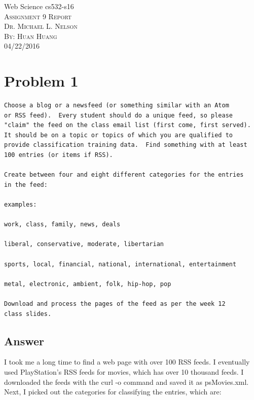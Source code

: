 \documentclass[12pt]{article}
\begin{document}
\begin{titlepage}
	\begin{center}
	\Huge{Web Science cs532-s16}\\
	[0.25in]
	\textsc{\Large Assignment 9 Report}\\
	\textsc{\normalsize Dr. Michael L. Nelson}\\
	[4.25in]
	\textsc{\normalsize By: Huan Huang}\\
	\large 04/22/2016\\
	
	
	\end{center}
\end{titlepage}
\newpage



\section*{Problem 1}


\begin{verbatim}
Choose a blog or a newsfeed (or something similar with an Atom
or RSS feed).  Every student should do a unique feed, so please
"claim" the feed on the class email list (first come, first served).
It should be on a topic or topics of which you are qualified to
provide classification training data.  Find something with at least
100 entries (or items if RSS).

Create between four and eight different categories for the entries
in the feed:

examples: 

work, class, family, news, deals

liberal, conservative, moderate, libertarian

sports, local, financial, national, international, entertainment

metal, electronic, ambient, folk, hip-hop, pop

Download and process the pages of the feed as per the week 12 
class slides.
\end{verbatim}

\subsection*{Answer}
I took me a long time to find a web page with over 100 RSS feeds. I eventually used PlayStation's RSS feeds for movies, which has over 10 thousand feeds. I downloaded the feeds with the curl -o command and saved it as psMovies.xml. Next, I picked out the categories for classifying the entries, which are:
\end{document}
